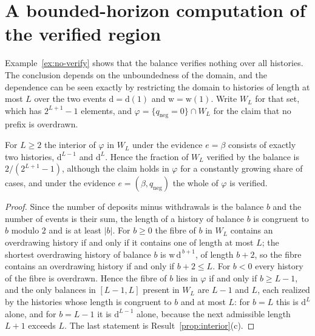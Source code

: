 \section{A bounded-horizon computation of the verified region}\label{sec:bounded-verify}

Example~\ref{ex:no-verify} shows that the balance verifies nothing over all histories. The conclusion depends on the unboundedness of the domain, and the dependence can be seen exactly by restricting the domain to histories of length at most $L$ over the two events $\mathrm d=\mathrm d(1)$ and $\mathrm w=\mathrm w(1)$. Write $W_L$ for that set, which has $2^{L+1}-1$ elements, and $\varphi=\{q_{\mathrm{neg}}=0\}\cap W_L$ for the claim that no prefix is overdrawn.

\begin{newresult}\label{prop:bounded-verify}
For $L\ge2$ the interior of $\varphi$ in $W_L$ under the evidence $e=\beta$ consists of exactly two histories, $\mathrm d^{L-1}$ and $\mathrm d^{L}$. Hence the fraction of $W_L$ verified by the balance is $2/(2^{L+1}-1)$, although the claim holds in $\varphi$ for a constantly growing share of cases, and under the evidence $e=(\beta,q_{\mathrm{neg}})$ the whole of $\varphi$ is verified.
\end{newresult}
\begin{proof}
Since the number of deposits minus withdrawals is the balance $b$ and the number of events is their sum, the length of a history of balance $b$ is congruent to $b$ modulo $2$ and is at least $|b|$. For $b\ge0$ the fibre of $b$ in $W_L$ contains an overdrawing history if and only if it contains one of length at most $L$; the shortest overdrawing history of balance $b$ is $\mathrm w\,\mathrm d^{\,b+1}$, of length $b+2$, so the fibre contains an overdrawing history if and only if $b+2\le L$. For $b<0$ every history of the fibre is overdrawn. Hence the fibre of $b$ lies in $\varphi$ if and only if $b\ge L-1$, and the only balances in $[L-1,L]$ present in $W_L$ are $L-1$ and $L$, each realized by the histories whose length is congruent to $b$ and at most $L$: for $b=L$ this is $\mathrm d^{L}$ alone, and for $b=L-1$ it is $\mathrm d^{L-1}$ alone, because the next admissible length $L+1$ exceeds $L$. The last statement is Result~\ref{prop:interior}(c).
\end{proof}

